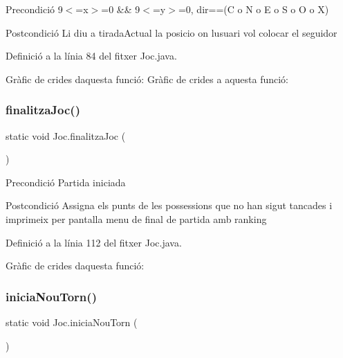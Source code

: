 \begin{DoxyPrecond}{Precondició}
9$<$=x$>$=0 \&\& 9$<$=y$>$=0, dir==(\textquotesingle{}C\textquotesingle{} o \textquotesingle{}N\textquotesingle{} o \textquotesingle{}E\textquotesingle{} o \textquotesingle{}S\textquotesingle{} o \textquotesingle{}O\textquotesingle{} o \textquotesingle{}X\textquotesingle{}) 
\end{DoxyPrecond}
\begin{DoxyPostcond}{Postcondició}
Li diu a tirada\+Actual la posicio on l\textquotesingle{}usuari vol colocar el seguidor 
\end{DoxyPostcond}


Definició a la línia 84 del fitxer Joc.\+java.

Gràfic de crides d\textquotesingle{}aquesta funció\+:
Gràfic de crides a aquesta funció\+:
\mbox{\label{class_joc_a98725350a7727b56245c526c405c7629}} 
\subsubsection{\texorpdfstring{finalitza\+Joc()}{finalitzaJoc()}}
{\footnotesize\ttfamily static void Joc.\+finalitza\+Joc (\begin{DoxyParamCaption}{ }\end{DoxyParamCaption})\hspace{0.3cm}{\ttfamily [static]}}

\begin{DoxyPrecond}{Precondició}
Partida iniciada 
\end{DoxyPrecond}
\begin{DoxyPostcond}{Postcondició}
Assigna els punts de les possessions que no han sigut tancades i imprimeix per pantalla menu de final de partida amb ranking 
\end{DoxyPostcond}


Definició a la línia 112 del fitxer Joc.\+java.

Gràfic de crides d\textquotesingle{}aquesta funció\+:
\mbox{\label{class_joc_aae62a162e3ae1cae45dea616914fcaba}} 
\subsubsection{\texorpdfstring{inicia\+Nou\+Torn()}{iniciaNouTorn()}}
{\footnotesize\ttfamily static void Joc.\+inicia\+Nou\+Torn (\begin{DoxyParamCaption}{ }\end{DoxyParamCaption})\hspace{0.3cm}{\ttfamily [static]}}

